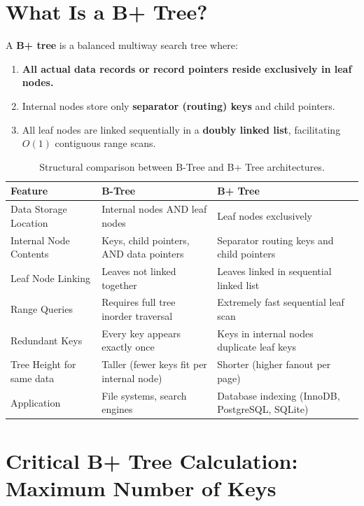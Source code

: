 \section{What Is a B+ Tree?}

A \textbf{B+ tree} is a balanced multiway search tree where:
\begin{enumerate}
    \item \textbf{All actual data records or record pointers reside exclusively in leaf nodes.}
    \item Internal nodes store only \textbf{separator (routing) keys} and child pointers.
    \item All leaf nodes are linked sequentially in a \textbf{doubly linked list}, facilitating $O(1)$ contiguous range scans.
\end{enumerate}

\begin{table}[htbp]
\centering
\small
\begin{tabularx}{\textwidth}{l X X}
\toprule
\textbf{Feature} & \textbf{B-Tree} & \textbf{B+ Tree} \\
\midrule
Data Storage Location     & Internal nodes AND leaf nodes           & Leaf nodes exclusively \\
Internal Node Contents    & Keys, child pointers, AND data pointers & Separator routing keys and child pointers \\
Leaf Node Linking         & Leaves not linked together              & Leaves linked in sequential linked list \\
Range Queries             & Requires full tree inorder traversal    & Extremely fast sequential leaf scan \\
Redundant Keys            & Every key appears exactly once          & Keys in internal nodes duplicate leaf keys \\
Tree Height for same data & Taller (fewer keys fit per internal node)& Shorter (higher fanout per page) \\
Application               & File systems, search engines            & Database indexing (InnoDB, PostgreSQL, SQLite) \\
\bottomrule
\end{tabularx}
\caption{Structural comparison between B-Tree and B+ Tree architectures.}
\end{table}

\section{Critical B+ Tree Calculation: Maximum Number of Keys}

